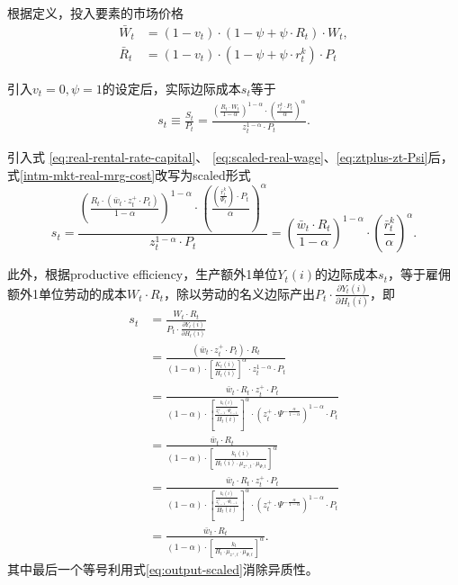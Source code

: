 根据定义，投入要素的市场价格
\begin{align}
  \label{intm-mkt-price-real-price-W}
  \bar{W}_t &= (1-v_t) \cdot (1-\psi + \psi \cdot R_t) \cdot W_t,\\
  \label{intm-mkt-price-real-price-R}
  \bar{R}_t &= (1-v_t) \cdot (1-\psi + \psi \cdot r_t^k) \cdot P_t
\end{align}

引入$v_t=0,\psi = 1$的设定后，实际边际成本$s_t$等于
\begin{align}
  \label{intm-mkt-real-mrg-cost}
s_t \equiv \frac{S_t}{P_t} = \frac{\left(\frac{R_t \cdot W_t}{1-\alpha}\right)^{1-\alpha} \cdot \left(\frac{r_t^k \cdot P_t}{\alpha}\right)^{\alpha}}{z_t^{1-\alpha} \cdot P_t}.
\end{align}

引入式  \eqref{eq:real-rental-rate-capital}、  \eqref{eq:scaled-real-wage}、\eqref{eq:ztplus-zt-Psi}后，式\eqref{intm-mkt-real-mrg-cost}改写为scaled形式
\begin{equation}
  \label{eq:intm-mkt-real-mrg-cost-scaled}
  s_t = \frac{\left(\frac{R_t \cdot \left(\bar{w}_t \cdot z_t^+ \cdot P_t \right)}{1-\alpha}\right)^{1-\alpha} \cdot \left(\frac{\left(\frac{\bar{r}_t^k}{\Psi_t}\right) \cdot P_t}{\alpha}\right)^{\alpha}}{z_t^{1-\alpha} \cdot P_t} = \left( \frac{\bar{w}_t \cdot R_t} {1-\alpha}\right)^{1-\alpha} \cdot \left( \frac{\bar{r}_{t}^k}{\alpha}\right)^{\alpha}.
\end{equation}

此外，根据productive efficiency，生产额外1单位$Y_t(i)$的边际成本$s_t$，等于雇佣额外1单位劳动的成本$W_t \cdot R_t$，除以劳动的名义边际产出$P_t \cdot \frac{\partial Y_t(i)}{\partial H_{t}(i)}$，即
\begin{equation}
  \label{eq:intm-mkt-real-mrg-cost-efficiency}
\begin{split}
  s_t
  &= \frac{W_t \cdot R_t}{P_t \cdot \frac{\partial Y_t(i)}{\partial H_t(i)}} \\
  &= \frac{\left(\bar{w}_t \cdot z_t^+ \cdot P_t\right) \cdot R_t}{(1-\alpha) \cdot \left[\frac{K_t(i)}{H_{t}(i)}\right]^{\alpha} \cdot z_t^{1-\alpha} \cdot P_t} \\
  &= \frac{\bar{w}_t \cdot R_t \cdot z_t^+ \cdot P_t}{(1-\alpha) \cdot \left[\frac{\frac{k_t(i)}{z_{t-1}^+ \cdot \Psi_{t-1}}}{H_{t}(i)}\right]^{\alpha} \cdot \left(z_t^+ \cdot \Psi^{-\frac{\alpha}{1-\alpha}}\right)^{1-\alpha} \cdot P_t} \\
      &=\frac{\bar{w}_t \cdot R_t}{(1-\alpha) \cdot \left[\frac{k_{t}(i)}{H_t(i) \cdot \mu_{z^{+},t} \cdot \mu_{\Psi, t}}\right]^{\alpha}}\\
        &= \frac{\bar{w}_t \cdot R_t \cdot z_t^+ \cdot P_t}{(1-\alpha) \cdot \left[\frac{\frac{k_t(i)}{z_{t-1}^+ \cdot \Psi_{t-1}}}{H_{t}(i)}\right]^{\alpha} \cdot \left(z_t^+ \cdot \Psi^{-\frac{\alpha}{1-\alpha}}\right)^{1-\alpha} \cdot P_t} \\
      &=\frac{\bar{w}_t \cdot R_t}{(1-\alpha) \cdot \left[\frac{k_{t}}{H_t \cdot \mu_{z^{+},t} \cdot \mu_{\Psi, t}}\right]^{\alpha}}.
\end{split}
\end{equation}
其中最后一个等号利用式\eqref{eq:output-scaled}消除异质性。



